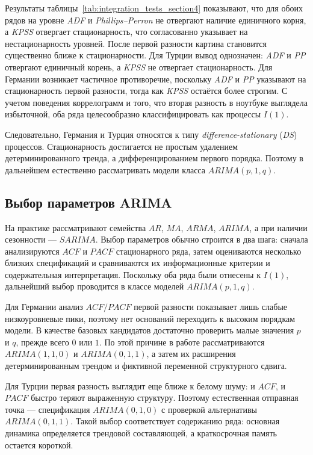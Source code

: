 \documentclass[12pt,a4paper]{article}
\begin{document}
Результаты таблицы~\ref{tab:integration_tests_section4} показывают, что для обоих рядов на уровне \textit{ADF} и \textit{Phillips--Perron} не отвергают наличие единичного корня, а \textit{KPSS} отвергает стационарность, что согласованно указывает на нестационарность уровней. После первой разности картина становится существенно ближе к стационарности. Для Турции вывод однозначен: \textit{ADF} и \textit{PP} отвергают единичный корень, а \textit{KPSS} не отвергает стационарность. Для Германии возникает частичное противоречие, поскольку \textit{ADF} и \textit{PP} указывают на стационарность первой разности, тогда как \textit{KPSS} остаётся более строгим. С учетом поведения коррелограмм и того, что вторая разность в ноутбуке выглядела избыточной, оба ряда целесообразно классифицировать как процессы $I(1)$.

Следовательно, Германия и Турция относятся к типу \textit{difference-stationary} (\textit{DS}) процессов. Стационарность достигается не простым удалением детерминированного тренда, а дифференцированием первого порядка. Поэтому в дальнейшем естественно рассматривать модели класса $ARIMA(p,1,q)$.

\subsection{Выбор параметров ARIMA}

На практике рассматривают семейства $AR$, $MA$, $ARMA$, $ARIMA$, а при наличии сезонности --- $SARIMA$. Выбор параметров обычно строится в два шага: сначала анализируются $ACF$ и $PACF$ стационарного ряда, затем оцениваются несколько близких спецификаций и сравниваются их информационные критерии и содержательная интерпретация. Поскольку оба ряда были отнесены к $I(1)$, дальнейший выбор проводится в классе моделей $ARIMA(p,1,q)$.

Для Германии анализ $ACF/PACF$ первой разности показывает лишь слабые низкоуровневые пики, поэтому нет оснований переходить к высоким порядкам модели. В качестве базовых кандидатов достаточно проверить малые значения $p$ и $q$, прежде всего $0$ или $1$. По этой причине в работе рассматриваются $ARIMA(1,1,0)$ и $ARIMA(0,1,1)$, а затем их расширения детерминированным трендом и фиктивной переменной структурного сдвига.

Для Турции первая разность выглядит еще ближе к белому шуму: и $ACF$, и $PACF$ быстро теряют выраженную структуру. Поэтому естественная отправная точка --- спецификация $ARIMA(0,1,0)$ с проверкой альтернативы $ARIMA(0,1,1)$. Такой выбор соответствует содержанию ряда: основная динамика определяется трендовой составляющей, а краткосрочная память остается короткой.
\end{document}
